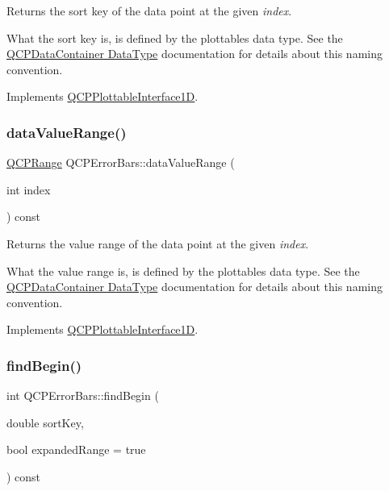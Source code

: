 Returns the sort key of the data point at the given {\itshape index}.

What the sort key is, is defined by the plottable\textquotesingle{}s data type. See the \hyperlink{classQCPDataContainer_qcpdatacontainer-datatype}{Q\+C\+P\+Data\+Container Data\+Type} documentation for details about this naming convention. 

Implements \hyperlink{classQCPPlottableInterface1D_afdc92f9f01e7e35f2e96b2ea9dc14ae7}{Q\+C\+P\+Plottable\+Interface1D}.

\mbox{\label{classQCPErrorBars_af71af55d929d832daf32e283b21e1f3e}} 
\subsubsection{\texorpdfstring{data\+Value\+Range()}{dataValueRange()}}
{\footnotesize\ttfamily \hyperlink{classQCPRange}{Q\+C\+P\+Range} Q\+C\+P\+Error\+Bars\+::data\+Value\+Range (\begin{DoxyParamCaption}\item[{int}]{index }\end{DoxyParamCaption}) const\hspace{0.3cm}{\ttfamily [virtual]}}

Returns the value range of the data point at the given {\itshape index}.

What the value range is, is defined by the plottable\textquotesingle{}s data type. See the \hyperlink{classQCPDataContainer_qcpdatacontainer-datatype}{Q\+C\+P\+Data\+Container Data\+Type} documentation for details about this naming convention. 

Implements \hyperlink{classQCPPlottableInterface1D_a9ca7fcf14d885a200879768679b19be9}{Q\+C\+P\+Plottable\+Interface1D}.

\mbox{\label{classQCPErrorBars_a74c57d6abb8eda3c4c31b72d1df9f568}} 
\subsubsection{\texorpdfstring{find\+Begin()}{findBegin()}}
{\footnotesize\ttfamily int Q\+C\+P\+Error\+Bars\+::find\+Begin (\begin{DoxyParamCaption}\item[{double}]{sort\+Key,  }\item[{bool}]{expanded\+Range = {\ttfamily true} }\end{DoxyParamCaption}) const\hspace{0.3cm}{\ttfamily [virtual]}}


